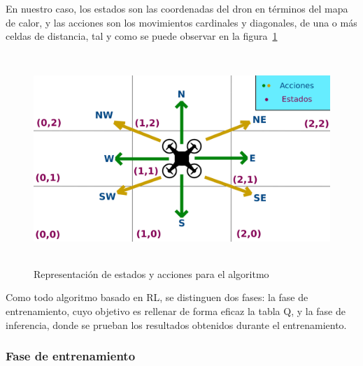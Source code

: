 En nuestro caso, los estados son las coordenadas del dron en términos del mapa de calor, y las acciones son los movimientos cardinales y diagonales, de una o más celdas de distancia, tal y como se puede observar en la figura~\ref{fig:expl_q}\\

\begin{figure} [t]
    \begin{center}
    \includegraphics[height=8cm]{imagenes/cap4/6_act_st.png}
    \end{center}
    \caption[Representación de estados y acciones para el algoritmo]{Representación de estados y acciones para el algoritmo}
    \label{fig:expl_q}
\end{figure}

Como todo algoritmo basado en \ac{RL}, se distinguen dos fases: la fase de entrenamiento, cuyo objetivo es rellenar de forma eficaz la tabla Q, y la fase de inferencia, donde se prueban los resultados obtenidos durante el entrenamiento.\\

\subsubsection{Fase de entrenamiento}
\label{subsubsec:train}

